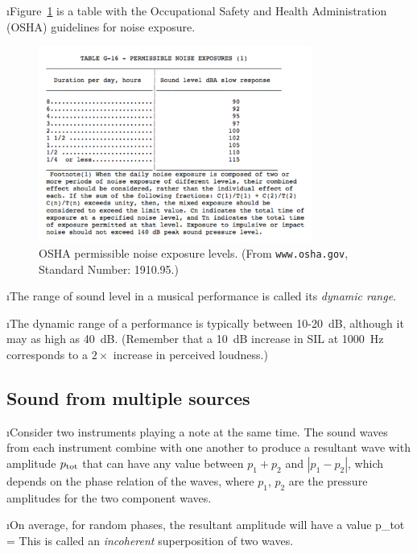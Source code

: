 \i Figure~\ref{f:OSHA-table} is a table with the
Occupational Safety and Health Administration 
(OSHA) guidelines for noise exposure.
%
\begin{figure}[htbp]
\begin{center}
\includegraphics[width=0.8\textwidth]{OSHA-table}
\caption{OSHA permissible noise exposure levels.
(From {\tt www.osha.gov}, Standard Number: 1910.95.)}
\label{f:OSHA-table}
\end{center}
\end{figure}
%

\i The range of sound level in a musical 
performance is called its {\em dynamic range}.

\i The dynamic range of a performance 
is typically between 10-20~dB, 
although it may as high as 40~dB.
(Remember that a 10~dB increase in SIL at 1000~Hz
corresponds to a $2\times$ increase in perceived loudness.)

\ei
\subsection{Sound from multiple sources}
\bi

\i Consider two instruments playing a note 
at the same time.
The sound waves from each instrument combine
with one another to produce a resultant wave 
with amplitude $p_{\rm tot}$ that can have 
any value between $p_1+p_2$ and $|p_1-p_2|$,
which depends on the phase relation of the waves,
where $p_1$, $p_2$ are the pressure amplitudes for
the two component waves.

\i On average, for random phases, the resultant 
amplitude will have a value
%
\be
p_{\rm tot} = 
\ee
%
This is called an {\em incoherent} superposition
of two waves.

